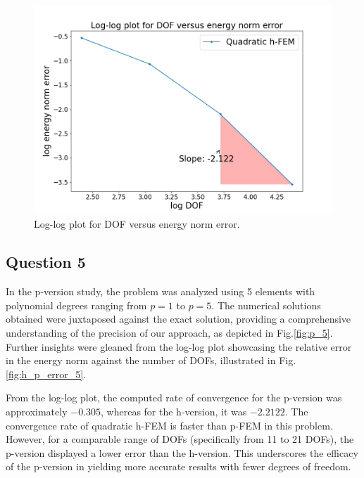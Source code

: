 \documentclass[twoside,twocolumn,10pt]{article}
\begin{document}
\begin{figure}[!ht]
  \centering
  \includegraphics[width=1.\linewidth]{Q1/logDOF_q_4.png}
  \caption{Log-log plot for DOF versus energy norm error.}
  \label{fig:h_error_4}
\end{figure}

\subsection{Question 5}
In the p-version study, the problem was analyzed using 5 elements with polynomial degrees ranging from \( p = 1 \) to \( p = 5 \). The numerical solutions obtained were juxtaposed against the exact solution, providing a comprehensive understanding of the precision of our approach, as depicted in Fig.\ref{fig:p_5}. Further insights were gleaned from the log-log plot showcasing the relative error in the energy norm against the number of DOFs, illustrated in Fig.\ref{fig:h_p_error_5}. 

From the log-log plot, the computed rate of convergence for the p-version was approximately \(-0.305\), whereas for the h-version, it was \(-2.2122\). The convergence rate of quadratic h-FEM is faster than p-FEM in this problem. However, for a comparable range of DOFs (specifically from 11 to 21 DOFs), the p-version displayed a lower error than the h-version. This underscores the efficacy of the p-version in yielding more accurate results with fewer degrees of freedom.
\end{document}
